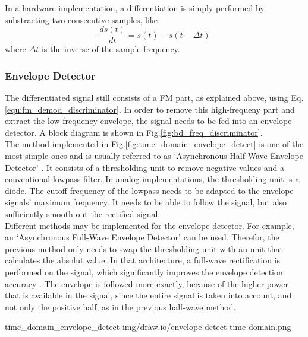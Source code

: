 In a hardware implementation, a differentiation is simply performed by substracting two consecutive samples, like
\begin{equation}
  \frac{d s(t)}{dt} = s(t) - s(t-\Delta t)
  \label{equ:differentiator_two_samples}
\end{equation}
where $\Delta t$ is the inverse of the sample frequency.\\ %

\subsubsection{Envelope Detector}

The differentiated signal still consists of a FM part, as explained above, using Eq.\eqref{equ:fm_demod_discriminator}.
In order to remove this high-frequeny part and extract the low-frequency envelope, the signal needs to be fed into an envelope detector.
A block diagram is shown in Fig.\ref{fig:bd_freq_discriminator}.\\

The method implemented in Fig.\ref{fig:time_domain_envelope_detect} is one of the most simple ones and is usually referred to as `Asynchronous Half-Wave Envelope Detector' \cite{DSPRelatedEnvelopeDetection}.
It consists of a thresholding unit to remove negative values and a conventional lowpass filter.
In analog implementations, the thresholding unit is a diode.
The cutoff frequency of the lowpass needs to be adapted to the envelope signals' maximum frequency.
It needs to be able to follow the signal, but also sufficiently smooth out the rectified signal.\\

Different methods may be implemented for the envelope detector.
For example, an `Asynchronous Full-Wave Envelope Detector' can be used.
Therefor, the previous method only needs to swap the thresholding unit with an unit that calculates the absolut value.
In that architecture, a full-wave rectification is performed on the signal, which significantly improves the envelope detection accuracy \cite{DSPRelatedEnvelopeDetection}.
The envelope is followed more exactly, because of the higher power that is available in the signal, since the entire signal is taken into account, and not only the positive half, as in the previous half-wave method.

 {time_domain_envelope_detect} {img/draw.io/envelope-detect-time-domain.png}

